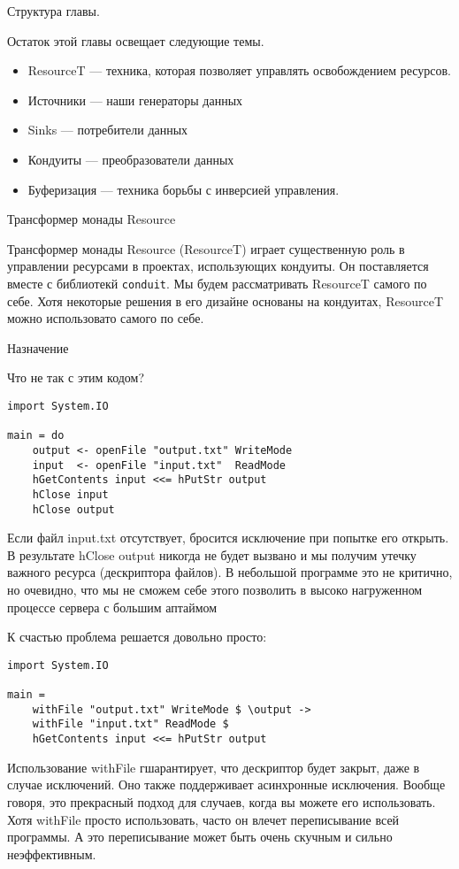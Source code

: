 Структура главы.

Остаток этой главы освещает следующие темы.
\begin{itemize}
 \item ResourceT --- техника, которая позволяет управлять освобождением ресурсов.
 \item Источники --- наши генераторы данных
 \item Sinks --- потребители данных
 \item Кондуиты --- преобразователи данных
 \item Буферизация --- техника борьбы с инверсией управления.
\end{itemize}

Трансформер монады Resource

Трансформер монады Resource (ResourceT) играет существенную роль в управлении ресурсами в
проектах, использующих кондуиты. Он поставляется вместе с библиотекй \verb=conduit=. Мы
будем рассматривать ResourceT самого по себе. Хотя некоторые решения в его дизайне
основаны на кондуитах, ResourceT можно использовато самого по себе.

Назначение

Что не так с этим кодом?
\begin{verbatim}
import System.IO

main = do
    output <- openFile "output.txt" WriteMode
    input  <- openFile "input.txt"  ReadMode
    hGetContents input <<= hPutStr output
    hClose input
    hClose output
\end{verbatim}

Если файл input.txt отсутствует, бросится исключение при попытке его открыть. В
результате hClose output никогда не будет вызвано и мы получим утечку важного ресурса
(дескриптора файлов). В небольшой программе это не критично, но очевидно, что мы не
сможем себе этого позволить в высоко нагруженном процессе сервера с большим аптаймом

К счастью проблема решается довольно просто:
\begin{verbatim}
import System.IO

main =
    withFile "output.txt" WriteMode $ \output ->
    withFile "input.txt" ReadMode $ 
    hGetContents input <<= hPutStr output
\end{verbatim}

Использование withFile гшарантирует, что дескриптор будет закрыт, даже в случае
исключений. Оно также поддерживает асинхронные исключения. Вообще говоря, это прекрасный
подход для случаев, когда вы можете его использовать. Хотя withFile просто использовать,
часто он влечет переписывание всей программы. А это переписывание может быть очень
скучным и сильно неэффективным.

